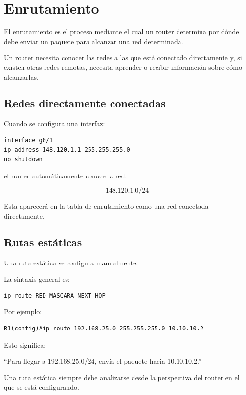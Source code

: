 \documentclass[12pt]{article}
\begin{document}
\section{Enrutamiento}

El enrutamiento es el proceso mediante el cual un router determina por dónde
debe enviar un paquete para alcanzar una red determinada.

Un router necesita conocer las redes a las que está conectado directamente
y, si existen otras redes remotas, necesita aprender o recibir información
sobre cómo alcanzarlas.


\subsection{Redes directamente conectadas}

Cuando se configura una interfaz:

\begin{lstlisting}
interface g0/1
ip address 148.120.1.1 255.255.255.0
no shutdown
\end{lstlisting}

el router automáticamente conoce la red:

\[
148.120.1.0/24
\]

Esta aparecerá en la tabla de enrutamiento como una red conectada
directamente.


\subsection{Rutas estáticas}

Una ruta estática se configura manualmente.

La sintaxis general es:

\begin{lstlisting}
ip route RED MASCARA NEXT-HOP
\end{lstlisting}

Por ejemplo:

\begin{lstlisting}
R1(config)#ip route 192.168.25.0 255.255.255.0 10.10.10.2
\end{lstlisting}

Esto significa:

\begin{center}
``Para llegar a 192.168.25.0/24, envía el paquete hacia 10.10.10.2.''
\end{center}

Una ruta estática siempre debe analizarse desde la perspectiva del router
en el que se está configurando.
\end{document}
